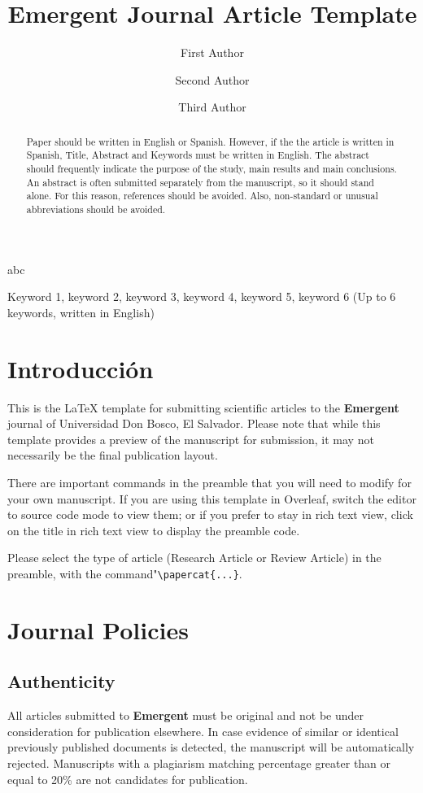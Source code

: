 \documentclass[letterpaper]{EmergentUDB}
\title{Emergent Journal Article Template}
\author[1{\authfn{1}}]{First Author \orcidlink{0000-0000-0000-0000}}
\author[2]{Second Author \orcidlink{0000-0000-0000-0000}}
\author[3]{Third Author\orcidlink{0000-0000-0000-0000}}
\affil[1]{First Institution}
\affil[2]{Second Institution}
\affil[3]{Third Institution}
\begin{document}
\begin{frontmatter}{a}{b}{c}
\maketitle
\begin{abstract}
Paper should be written in English or Spanish. However, if the the article is written in Spanish, Title, Abstract and Keywords must be written in English. The abstract should frequently indicate the purpose of the study, main results and main conclusions. An abstract is often submitted separately from the manuscript, so it should stand alone. For this reason, references should be avoided. Also, non-standard or unusual abbreviations should be avoided. 
\end{abstract}

\begin{keywords}
Keyword 1, keyword 2, keyword 3, keyword 4, keyword 5, keyword 6 (Up to 6 keywords, written in English)
\end{keywords}
\end{frontmatter}

\section{Introducción}

This is the \LaTeX{} template for submitting scientific articles to the \textbf{Emergent} journal of Universidad Don Bosco, El Salvador. Please note that while this template provides a preview of the manuscript for submission, it may not necessarily be the final publication layout.

There are important commands in the preamble that you will need to modify for your own manuscript. If you are using this template in Overleaf, switch the editor to source code mode to view them; or if you prefer to stay in rich text view, click on the title in rich text view to display the preamble code.

Please select the type of article (Research Article or Review Article) in the preamble, with the command"\verb|\papercat{...}|.


\section{Journal Policies}
\subsection{Authenticity}
All articles submitted to \textbf{Emergent} must be original and not be under consideration for publication elsewhere. In case evidence of similar or identical previously published documents is detected, the manuscript will be automatically rejected. Manuscripts with a plagiarism matching percentage greater than or equal to 20\% are not candidates for publication.
\end{document}
